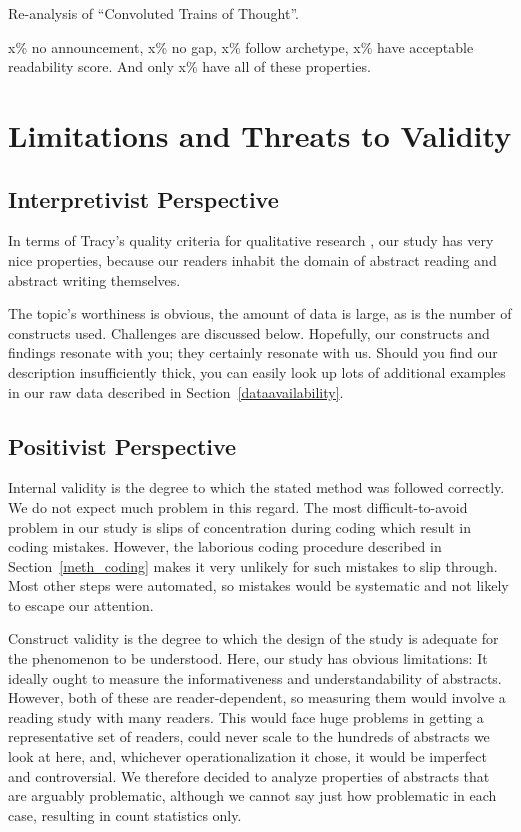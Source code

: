 \documentclass[10pt,journal,compsoc]{IEEEtran}
\begin{document}
Re-analysis of ``Convoluted Trains of Thought''.

x\% no announcement, x\% no gap, x\% follow archetype, x\% have acceptable readability score.
And only x\% have all of these properties.




\section{Limitations and Threats to Validity}

\subsection{Interpretivist Perspective}

In terms of Tracy's quality criteria for qualitative research \cite{Tracy10},
our study has very nice properties, because our readers inhabit
the domain of abstract reading and abstract writing themselves.

The topic's worthiness is obvious, the amount of data is large,
as is the number of constructs used.
Challenges are discussed below.
Hopefully, our constructs and findings resonate with you;
they certainly resonate with us.
Should you find our description insufficiently thick,
you can easily look up lots of additional examples in our raw data
described in Section~\ref{dataavailability}.


\subsection{Positivist Perspective}

Internal validity is the degree to which the stated method
was followed correctly.
We do not expect much problem in this regard.
The most difficult-to-avoid problem in our study is slips of concentration
during coding which result in coding mistakes.
However, the laborious coding procedure
described in Section~\ref{meth_coding}
makes it very unlikely for such mistakes to slip through.
Most other steps were automated, so mistakes would be systematic
and not likely to escape our attention.

Construct validity is the degree to which the design
of the study is adequate for the phenomenon to be understood.
Here, our study has obvious limitations:
It ideally ought to measure the informativeness and understandability of
abstracts. However, both of these are reader-dependent, so
measuring them would involve a reading study with many readers.
This would face huge problems in getting a representative set of readers,
could never scale to the hundreds of abstracts we look at here,
and, whichever operationalization it chose,
it would be imperfect and controversial.
We therefore decided to analyze properties of abstracts
that are arguably problematic, although we cannot say just how
problematic in each case, resulting in count statistics only.
\end{document}
